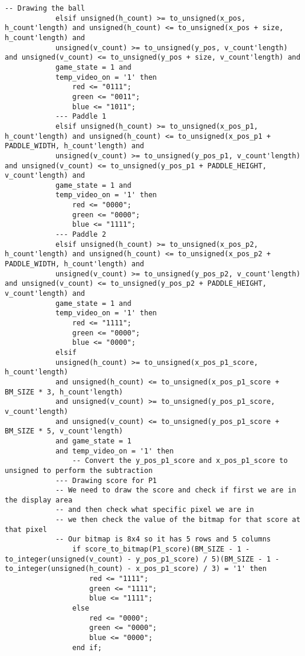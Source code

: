 \documentclass{article}
\begin{document}
\begin{lstlisting}[caption=Draw Process, label=lst:draw-process]
        -- Drawing the ball
            elsif unsigned(h_count) >= to_unsigned(x_pos, h_count'length) and unsigned(h_count) <= to_unsigned(x_pos + size, h_count'length) and
            unsigned(v_count) >= to_unsigned(y_pos, v_count'length) and unsigned(v_count) <= to_unsigned(y_pos + size, v_count'length) and
            game_state = 1 and
            temp_video_on = '1' then  
                red <= "0111";
                green <= "0011";
                blue <= "1011";
            --- Paddle 1
            elsif unsigned(h_count) >= to_unsigned(x_pos_p1, h_count'length) and unsigned(h_count) <= to_unsigned(x_pos_p1 + PADDLE_WIDTH, h_count'length) and
            unsigned(v_count) >= to_unsigned(y_pos_p1, v_count'length) and unsigned(v_count) <= to_unsigned(y_pos_p1 + PADDLE_HEIGHT, v_count'length) and
            game_state = 1 and
            temp_video_on = '1' then
                red <= "0000";
                green <= "0000";
                blue <= "1111";
            --- Paddle 2
            elsif unsigned(h_count) >= to_unsigned(x_pos_p2, h_count'length) and unsigned(h_count) <= to_unsigned(x_pos_p2 + PADDLE_WIDTH, h_count'length) and
            unsigned(v_count) >= to_unsigned(y_pos_p2, v_count'length) and unsigned(v_count) <= to_unsigned(y_pos_p2 + PADDLE_HEIGHT, v_count'length) and
            game_state = 1 and
            temp_video_on = '1' then
                red <= "1111";
                green <= "0000";
                blue <= "0000";
            elsif 
            unsigned(h_count) >= to_unsigned(x_pos_p1_score, h_count'length) 
            and unsigned(h_count) <= to_unsigned(x_pos_p1_score + BM_SIZE * 3, h_count'length) 
            and unsigned(v_count) >= to_unsigned(y_pos_p1_score, v_count'length) 
            and unsigned(v_count) <= to_unsigned(y_pos_p1_score + BM_SIZE * 5, v_count'length) 
            and game_state = 1
            and temp_video_on = '1' then
                -- Convert the y_pos_p1_score and x_pos_p1_score to unsigned to perform the subtraction
            --- Drawing score for P1
            -- We need to draw the score and check if first we are in the display area
            -- and then check what specific pixel we are in
            -- we then check the value of the bitmap for that score at that pixel
            -- Our bitmap is 8x4 so it has 5 rows and 5 columns
                if score_to_bitmap(P1_score)(BM_SIZE - 1 - to_integer(unsigned(v_count) - y_pos_p1_score) / 5)(BM_SIZE - 1 - to_integer(unsigned(h_count) - x_pos_p1_score) / 3) = '1' then
                    red <= "1111";
                    green <= "1111";
                    blue <= "1111";
                else
                    red <= "0000";
                    green <= "0000";
                    blue <= "0000";
                end if;


\end{lstlisting}
\end{document}

